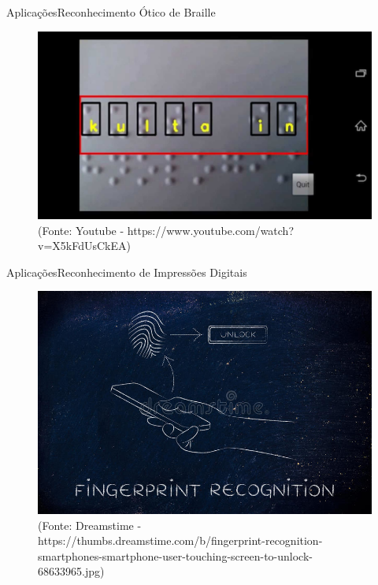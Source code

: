 \begin{frame}{Aplicações}{Reconhecimento Ótico de Braille}

\begin{figure}
    \centering
    \includegraphics[scale=.2]{img/obr.jpg}
    \caption{(Fonte: Youtube - https://www.youtube.com/watch?v=X5kFdUsCkEA)}
    \label{fig:optical_braille_recognition}
\end{figure}

\end{frame}

\begin{frame}{Aplicações}{Reconhecimento de Impressões Digitais}

\begin{figure}

    \centering
    \includegraphics[scale=1]{img/fingerprint_recognition.jpg}
    \caption{(Fonte: Dreamstime - https://thumbs.dreamstime.com/b/fingerprint-recognition-smartphones-smartphone-user-touching-screen-to-unlock-68633965.jpg)}
    \label{fig:fingerprint_recognition}
\end{figure}

\end{frame} 

